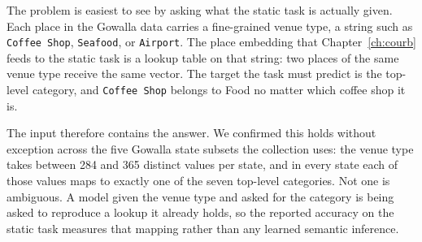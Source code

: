 %
The problem is easiest to see by asking what the static task is actually given. Each place in the
Gowalla data carries a fine-grained venue type, a string such as \texttt{Coffee Shop},
\texttt{Seafood}, or \texttt{Airport}. The place embedding that Chapter~\ref{ch:courb} feeds to the
static task is a lookup table on that string: two places of the same venue type receive the same
vector. The target the task must predict is the top-level category, and \texttt{Coffee Shop} belongs
to Food no matter which coffee shop it is.

The input therefore contains the answer. We confirmed this holds without exception across the five
Gowalla state subsets the collection uses: the venue type takes between 284 and 365 distinct values
per state, and in every state each of those values maps to exactly one of the seven top-level
categories. Not one is ambiguous. A model given the venue type and asked for the category is being
asked to reproduce a lookup it already holds, so the reported accuracy on the static task measures
that mapping rather than any learned semantic inference.

